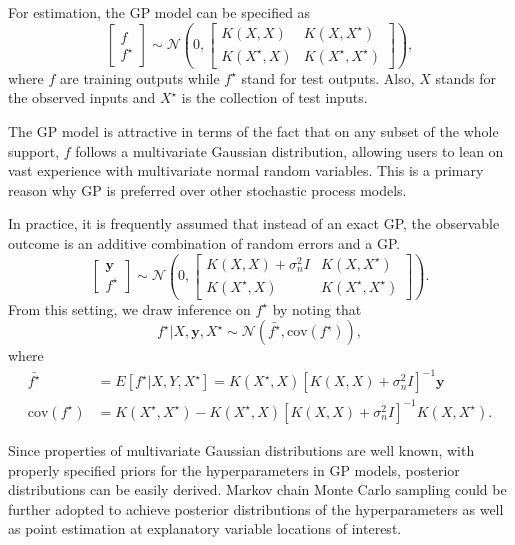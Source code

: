 For estimation, the GP model can be specified as
\begin{equation}
\begin{bmatrix}f \\f^\star\end{bmatrix}
\sim \mathcal{N}\left(0,\begin{bmatrix}K(X,X) & K(X,X^\star) \\K(X^\star, X) & K(X^\star,X^\star)\end{bmatrix}\right),
\end{equation}
where $f$ are training outputs while $f^\star$ stand for test outputs. Also, $X$ stands for the observed inputs and $X^\star$ is the collection of test inputs.

The GP model is attractive in terms of the fact that on any subset of the whole support, $f$ follows a multivariate Gaussian distribution, allowing users to lean on vast experience with multivariate normal random variables. This is a primary reason why GP is preferred over other stochastic process models.

In practice, it is frequently assumed that instead of an exact GP, the observable outcome is an additive combination of random errors and a GP. 
\begin{equation}
\begin{bmatrix}\mathbf{y} \\f^\star\end{bmatrix}
\sim \mathcal{N}\left(0,\begin{bmatrix}K(X,X)+\sigma_n^2I & K(X,X^\star) \\K(X^\star, X) & K(X^\star,X^\star)\end{bmatrix}\right).
\end{equation}
From this setting, we draw inference on $f^\star$ by noting that
\begin{equation}
f^\star|X,\mathbf{y},X^\star\sim \mathcal{N}(\bar{f^\star},\text{cov}(f^\star)),
\end{equation}
where
\begin{align}
\bar{f^\star}&=E[f^\star|X,Y,X^\star]=K(X^\star,X)[K(X,X)+\sigma_n^2I]^{-1}\mathbf{y}\\
\text{cov}(f^\star)&=K(X^\star,X^\star)-K(X^\star,X)[K(X,X)+\sigma_n^2I]^{-1}K(X,X^\star).
\end{align}

Since properties of multivariate Gaussian distributions are well known, with properly specified priors for the hyperparameters in GP models, posterior distributions can be easily derived. Markov chain Monte Carlo sampling could be further adopted to achieve posterior distributions of the hyperparameters as well as point estimation at explanatory variable locations of interest. 

